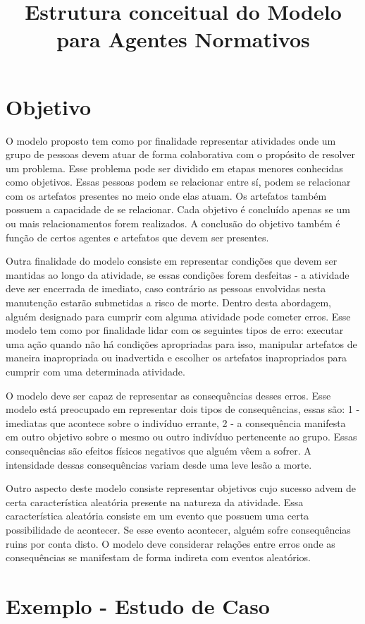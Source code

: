 \documentclass[12pt]{article}
\title{Estrutura conceitual do Modelo para Agentes Normativos}
\begin{document}
 

\section{Objetivo}

O modelo proposto tem como por finalidade representar atividades onde um grupo de pessoas  devem atuar de forma colaborativa com o propósito de resolver um problema. Esse problema pode ser dividido em etapas menores conhecidas como objetivos. Essas pessoas podem se relacionar entre sí, podem se relacionar com os artefatos presentes no meio 
onde elas atuam. Os artefatos também possuem a capacidade de se relacionar. Cada objetivo é concluído apenas se  um ou mais relacionamentos forem realizados. A conclusão do objetivo também é função de certos agentes e artefatos que devem ser presentes. 

Outra finalidade do modelo consiste em representar condições que devem ser mantidas ao longo da atividade, se essas condições forem desfeitas - a atividade deve ser encerrada de imediato, caso contrário as pessoas envolvidas nesta manutenção estarão submetidas a risco de morte. Dentro desta abordagem, alguém designado para cumprir com alguma atividade pode cometer erros. Esse modelo tem como por finalidade lidar com os seguintes tipos de erro: executar uma ação quando não há condições apropriadas para isso, manipular artefatos de maneira inapropriada ou inadvertida e escolher os artefatos inapropriados para cumprir com uma determinada atividade.

O modelo deve ser capaz de representar as consequências desses erros. Esse modelo está preocupado em representar dois tipos de consequências, essas são: 1 - imediatas que acontece sobre o indivíduo errante, 2 - a consequência manifesta em outro objetivo sobre o mesmo ou outro indivíduo pertencente ao grupo. Essas consequências são efeitos físicos negativos que alguém vêem a sofrer. A intensidade dessas consequências variam desde uma leve lesão a morte.

Outro aspecto deste modelo consiste representar objetivos cujo sucesso advem de certa característica aleatória presente na natureza da atividade. Essa característica aleatória consiste em um evento que possuem uma certa possibilidade de acontecer. Se esse evento acontecer, alguém sofre consequências ruins por conta disto. O modelo deve considerar relações entre erros onde as consequências se manifestam de forma indireta com eventos aleatórios.         

\section{Exemplo - Estudo de Caso}
\end{document}
